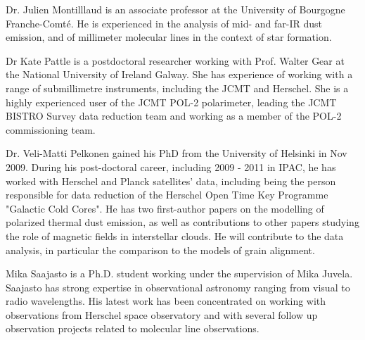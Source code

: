 \documentclass[11pt]{amsart}
\begin{document}
\vspace{5mm}

Dr. Julien Montilllaud is an associate professor at the University of Bourgogne Franche-Comt\'e. 
He is experienced in the analysis of mid- and far-IR dust emission, and of millimeter molecular lines in the context of star formation.


\vspace{5mm}

Dr Kate Pattle is a postdoctoral researcher working with Prof. Walter Gear at the National University of Ireland Galway.  She has experience of working with a range of submillimetre instruments, including the JCMT and Herschel.  She is a highly experienced user of the JCMT POL-2 polarimeter, leading the JCMT BISTRO Survey data reduction team and working as a member of the POL-2 commissioning team.

\vspace{5mm}

Dr. Veli-Matti Pelkonen gained his PhD from the University of Helsinki in Nov 2009. During his post-doctoral career, including 2009 - 2011 in IPAC, he has worked with Herschel and Planck satellites' data, including being the person responsible for data reduction of the Herschel Open Time Key Programme "Galactic Cold Cores". He has two first-author papers on the modelling of polarized thermal dust emission, as well as contributions to other papers studying the role of magnetic fields in interstellar clouds. He will contribute to the data analysis, in particular the comparison to the models of grain alignment.

\vspace{5mm}
Mika Saajasto is a Ph.D. student working under the supervision of Mika Juvela. Saajasto has strong expertise in observational astronomy ranging from visual to radio wavelengths. His latest work has been concentrated on working with observations from Herschel space observatory and with several follow up observation projects related to molecular line observations.
\end{document}

